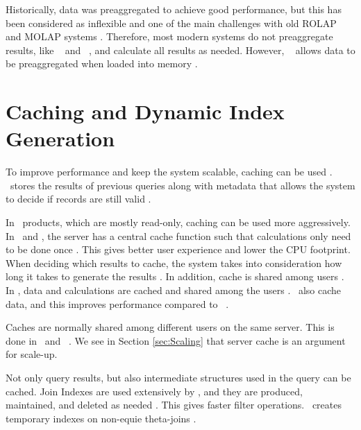 Historically, data was preaggregated to achieve good performance, but this has been considered as inflexible and one of the main challenges with old ROLAP and MOLAP systems \cite{Boncz2002-yj}. Therefore, most modern systems do not preaggregate results, like \sapnw~\cite{Lemke2010-is} and \qlikview~\cite{Qlik2014-vd}, and calculate all results as needed. However, \qlikview~ allows data to be preaggregated when loaded into memory \cite{Qlik2011-yc}.



\section{Caching and Dynamic Index Generation}
\label{sec:Caching and Dynamic Index Generation}
To improve performance and keep the system scalable, caching can be used \cite{Plattner2014-fr}. \exasol~stores the results of previous queries along with metadata that allows the system to decide if records are still valid \cite{Exasol2014-xh}. 

In \bd~products, which are mostly read-only, caching can be used more aggressively. In \qlikview~and \tableau, the server has a central cache function such that calculations only need to be done once \cite{Kamkolkar2015-iq, Qlik2011-ef}. This gives better user experience and lower the CPU footprint. When deciding which results to cache, the system takes into consideration how long it takes to generate the results \cite{noauthor_undated-js}. In addition, cache is shared among users \cite{Qlik2011-yc}. In \tableau, data and calculations are cached and shared among the users \cite{Kamkolkar2015-iq}. \vertipaq~also cache data, and this improves performance compared to \mssql~\cite{Ferrari2012-hm}.

Caches are normally shared among different users on the same server. This is done in \qlikview~and \tableau~\cite{Kamkolkar2015-iq, Qlik2011-yc}. We see in Section \ref{sec:Scaling} that server cache is an argument for scale-up.

Not only query results, but also intermediate structures used in the query can be cached. Join Indexes are used extensively by \exasol, and they are produced, maintained, and deleted as needed \cite{Exasol2014-xh}. This gives faster filter operations. \monetxq~creates temporary indexes on non-equie theta-joins \cite{Boncz2006-md}.

